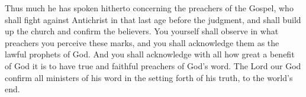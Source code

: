 Thus much he has spoken hitherto concerning the preachers of the Gospel, who shall fight against Antichrist in that last age before the judgment, and shall build up the church and confirm the believers. You yourself shall observe in what preachers you perceive these marks, and you shall acknowledge them as the lawful prophets of God. And you shall acknowledge with all how great a benefit of God it is to have true and faithful preachers of God’s word. The Lord our God confirm all ministers of his word in the setting forth of his truth, to the world’s end.
